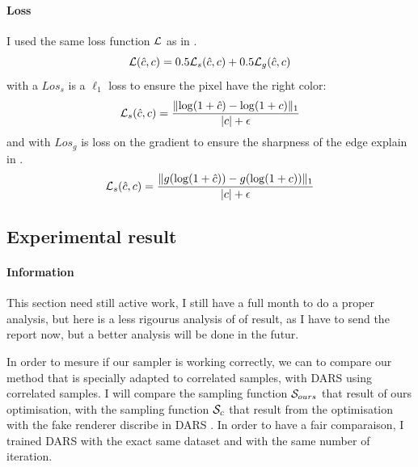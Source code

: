 \documentclass{classeENS}
\begin{document}
\paragraph*{Loss} I used the same loss function $\mathcal L$ as in \cite{kuznetsov2018deep}.
\begin{equation}
    \label{eq:6}
    \mathcal L(\hat c,c) = 0.5\mathcal L_s(\hat c,c) + 0.5\mathcal L_g(\hat c,c) 
\end{equation}
with a $Los_s$ is a $\ell_1$ loss to ensure the pixel have the right color:
\begin{equation}
    \label{eq:7}
    \mathcal L_s(\hat c,c) = \frac{\lVert \log(1+\hat c) - \log(1+c) \rVert_1}{|c| + \epsilon}
\end{equation}
and with $Los_g$ is loss on the gradient to ensure the sharpness of the edge explain in \cite{5617283}.
\begin{equation}
    \label{eq:8}
    \mathcal L_s(\hat c,c) = \frac{\lVert g(\log(1+\hat c)) - g(\log(1+c)) \rVert_1}{|c| + \epsilon}
\end{equation}

\subsection{Experimental result}

\paragraph*{Information} This section need still active work, 
I still have a full month to do a proper analysis, but
here is a less rigourus analysis of of result, as I have to send 
the report now, but a better analysis will be done in the futur.

In order to mesure if our sampler is working correctly, we can to compare our method 
that is specially adapted to correlated samples, with DARS using correlated samples. I will compare
the sampling function $\mathcal S_{ours}$ that result of ours optimisation, with the sampling 
function $\mathcal S_{c}$ that result from the optimisation with the fake renderer discribe in DARS \cite{kuznetsov2018deep}.
In order to have a fair comparaison, I trained DARS with the exact same dataset 
and with the same number of iteration.
\end{document}
